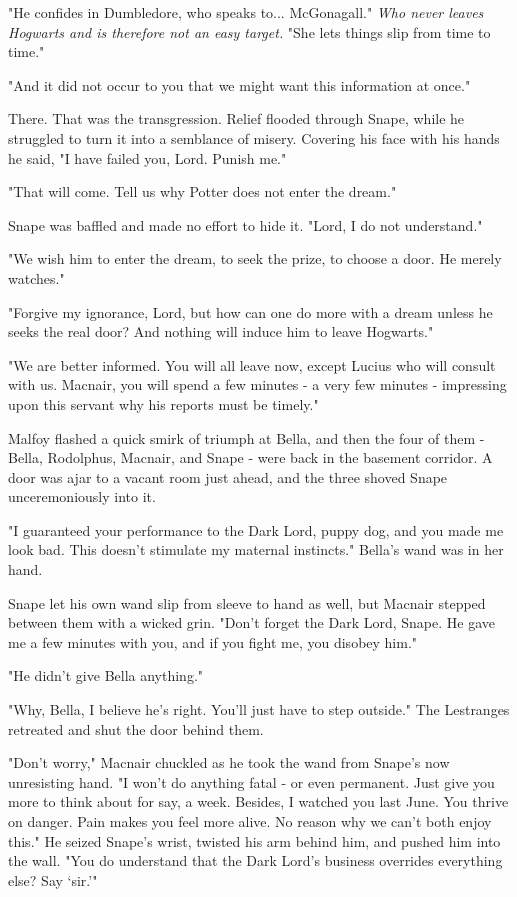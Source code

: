 \documentclass[a4paper,11pt]{article}
\begin{document}
"He confides in Dumbledore, who speaks to... McGonagall." \emph{Who never leaves Hogwarts and is therefore not an easy target.} "She lets things slip from time to time."

"And it did not occur to you that we might want this information at once."

There. That was the transgression. Relief flooded through Snape, while he struggled to turn it into a semblance of misery. Covering his face with his hands he said, "I have failed you, Lord. Punish me."

"That will come. Tell us why Potter does not enter the dream."

Snape was baffled and made no effort to hide it. "Lord, I do not understand."

"We wish him to enter the dream, to seek the prize, to choose a door. He merely watches."

"Forgive my ignorance, Lord, but how can one do more with a dream unless he seeks the real door? And nothing will induce him to leave Hogwarts."

"We are better informed. You will all leave now, except Lucius who will consult with us. Macnair, you will spend a few minutes - a very few minutes - impressing upon this servant why his reports must be timely."

Malfoy flashed a quick smirk of triumph at Bella, and then the four of them - Bella, Rodolphus, Macnair, and Snape - were back in the basement corridor. A door was ajar to a vacant room just ahead, and the three shoved Snape unceremoniously into it.

"I guaranteed your performance to the Dark Lord, puppy dog, and you made me look bad. This doesn't stimulate my maternal instincts." Bella's wand was in her hand.

Snape let his own wand slip from sleeve to hand as well, but Macnair stepped between them with a wicked grin. "Don't forget the Dark Lord, Snape. He gave me a few minutes with you, and if you fight me, you disobey him."

"He didn't give Bella anything."

"Why, Bella, I believe he's right. You'll just have to step outside." The Lestranges retreated and shut the door behind them.

"Don't worry," Macnair chuckled as he took the wand from Snape's now unresisting hand. "I won't do anything fatal - or even permanent. Just give you more to think about for say, a week. Besides, I watched you last June. You thrive on danger. Pain makes you feel more alive. No reason why we can't both enjoy this." He seized Snape's wrist, twisted his arm behind him, and pushed him into the wall. "You do understand that the Dark Lord's business overrides everything else? Say `sir.'"
\end{document}
